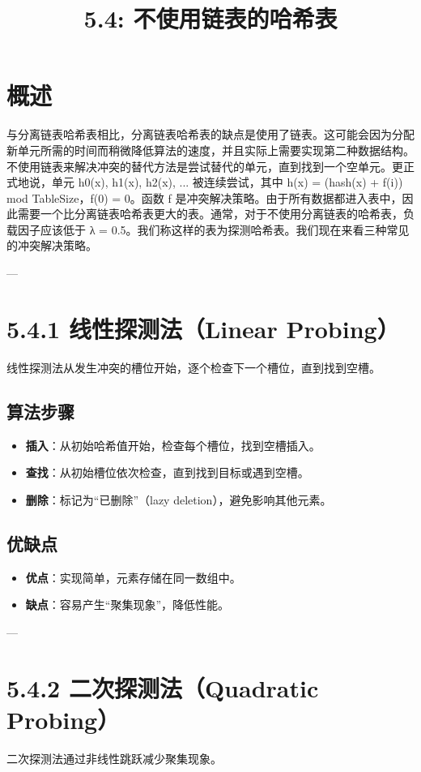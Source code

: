 \documentclass[a4paper,12pt]{article}
\title{5.4: 不使用链表的哈希表}
\author{}
\date{}
\begin{document}
\maketitle

\section*{概述}
与分离链表哈希表相比，分离链表哈希表的缺点是使用了链表。这可能会因为分配新单元所需的时间而稍微降低算法的速度，并且实际上需要实现第二种数据结构。不使用链表来解决冲突的替代方法是尝试替代的单元，直到找到一个空单元。更正式地说，单元 h0(x), h1(x), h2(x), ... 被连续尝试，其中 h(x) = (hash(x) + f(i)) mod TableSize，f(0) = 0。函数 f 是冲突解决策略。由于所有数据都进入表中，因此需要一个比分离链表哈希表更大的表。通常，对于不使用分离链表的哈希表，负载因子应该低于 λ = 0.5。我们称这样的表为探测哈希表。我们现在来看三种常见的冲突解决策略。

---

\section{5.4.1 线性探测法（Linear Probing）}
线性探测法从发生冲突的槽位开始，逐个检查下一个槽位，直到找到空槽。

\subsection*{算法步骤}
\begin{itemize}
    \item \textbf{插入}：从初始哈希值开始，检查每个槽位，找到空槽插入。
    \item \textbf{查找}：从初始槽位依次检查，直到找到目标或遇到空槽。
    \item \textbf{删除}：标记为“已删除”（lazy deletion），避免影响其他元素。
\end{itemize}

\subsection*{优缺点}
\begin{itemize}
    \item \textbf{优点}：实现简单，元素存储在同一数组中。
    \item \textbf{缺点}：容易产生“聚集现象”，降低性能。
\end{itemize}

---

\section{5.4.2 二次探测法（Quadratic Probing）}
二次探测法通过非线性跳跃减少聚集现象。
\end{document}

